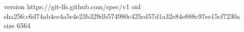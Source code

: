version https://git-lfs.github.com/spec/v1
oid sha256:c6d74ab4ee4a5e4e23b329db574980c425cd57d1a32e84e888c97ee15cf7230a
size 6564
